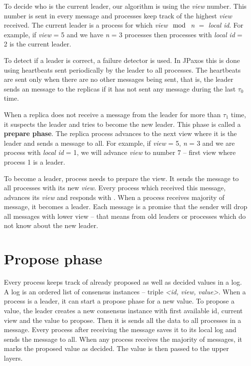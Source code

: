 To decide who is the current leader, our algorithm is using the \textit{view} number. This number is sent in every message and processes keep track of the highest \textit{view} received. The current leader is a process for which \textit{view $\mod$ n $=$ local id}. For example, if \textit{view} = 5 and we have \textit{n} = 3 processes then processes with \textit{local id} = 2 is the current leader.

To detect if a leader is correct, a failure detector is used. In JPaxos this is done using heartbeats sent periodically by the leader to all processes. The heartbeats are sent only when there are no other messages being sent, that is, the leader sends an \alive message to the replicas if it has not sent any message during the last $\tau_0$ time.

\begin{TODO} %
When a replica does not receive a message from the leader for more than $\tau_1$ time, it suspects the leader and tries to become the new leader. This phase is called a \textbf{prepare phase}. The replica process advances to the next view where it is the leader and sends a \prepare message to all. For example, if \textit{view} = 5, \textit{n} = 3 and we are process with \textit{local id} = 1, we will advance \textit{view} to number 7 -- first view where process 1 is a leader.

To become a leader, process needs to prepare the view. It sends the \prepare message to all processes with its new \textit{view}. Every process which received this message, advances its \textit{view} and responds with \prepareOK[]. When a process receives majority of \prepareOK message, it becomes a leader. Each \prepareOK message is a promise that the sender will drop all messages with lower view -- that means from old leaders or processes which do not know about the new leader.
\end{TODO}


\section{Propose phase} 

Every process keeps track of already proposed as well as decided values in a log. A log is an ordered list of consensus instances -- triple \textit{<id, view, value>}. When a process is a leader, it can start a propose phase for a new value. To propose a value, the leader creates a new consensus instance with first available id, current view and the value to propose. Then it is sends all the data to all processes in a \propose message. Every process after receiving the \propose message saves it to its local log and sends the \accept message to all. When any process receives the majority of \accept messages, it marks the proposed value as decided. The value is then passed to the upper layers.


